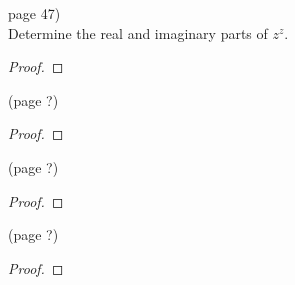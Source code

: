 \documentclass{article}
\newenvironment{problem}[2][Problem]{\begin{trivlist}
\item[\hskip \labelsep {\bfseries #1}\hskip \labelsep {\bfseries #2.}]}{\end{trivlist}}
\begin{document}
\pagebreak

\begin{problem}{7} (page 47) \\
  Determine the real and imaginary parts of $z^z$.
\end{problem}

\begin{proof}
\end{proof}

\pagebreak

\begin{problem}{?} (page ?) \\
\end{problem}

\begin{proof}
\end{proof}

\pagebreak

\begin{problem}{?} (page ?) \\
\end{problem}

\begin{proof}
\end{proof}

\pagebreak

\begin{problem}{?} (page ?) \\
\end{problem}

\begin{proof}
\end{proof}
\end{document}
